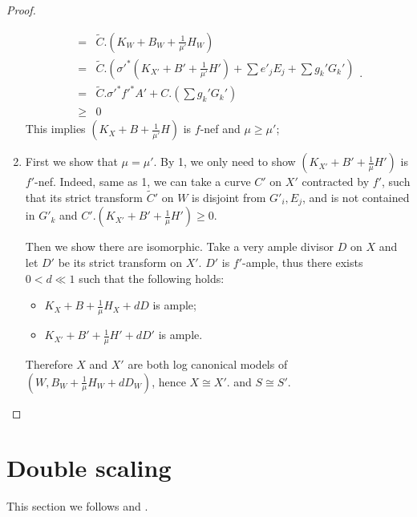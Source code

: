 \documentclass{article}
\begin{document}
\begin{proof}
\begin{enumerate}
\[\begin{aligned}
          =&\tilde{C}.\left(K_W+B_W+\frac{1}{\mu'}H_W\right)\\
          =&\tilde{C}.\left(\sigma'^*\left(K_{X'}+B'+\frac{1}{\mu'}H'\right)+\sum e'_jE_j+ \sum g_k'G_k'\right)\\
          =&\tilde{C}.\sigma'^*f'^*A'+C.\left(\sum g_k'G_k'\right)\\
          \geqslant&0
        \end{aligned}
      .\]
     This implies $ (K_X+B+\frac{1}{\mu'}H) $ is $ f $-nef and $ \mu\geqslant \mu' $;
   \item  First we show that $ \mu=\mu' $. By 1, we only need to show $ (K_{X'}+B'+\frac{1}{\mu}H') $ is $ f' $-nef. Indeed,  same as 1, we can take a curve $ C' $ on $X'$ contracted by $f'$, such that its strict transform $\tilde{C}'$ on $W$ is disjoint from  $ G'_i, E_j $, and is not contained in $ G'_k $ and 
     $C'.\left(K_{X'}+B'+\frac{1}{\mu}H'\right)\geqslant 0$.

Then we show there are isomorphic. Take a very ample divisor $ D $ on $ X $ and let $ D'  $ be its strict transform on $ X' $. $ D' $ is $ f' $-ample, thus there exists $ 0<d\ll1 $ such that the following holds:
      \begin{itemize}
        \item $ K_X+B+\frac{1}{\mu }H_X+dD $ is ample;
        \item $ K_{X'}+B'+\frac{1}{\mu }H'+dD' $ is ample.
      \end{itemize}
    Therefore $X$ and $X'$ are both log canonical models of $(W,B_{W}+\frac{1}{\mu}H_{W}+dD_{W})$, hence $X\cong X'$. and $S\cong S'$.  
  \end{enumerate} \end{proof}

\section{Double scaling}
This section we follows \cite[13.The Sarkisov program]{haconMinimalModelProgram2012} and  \cite{liuSarkisovProgramGeneralized2019}.
\end{document}
